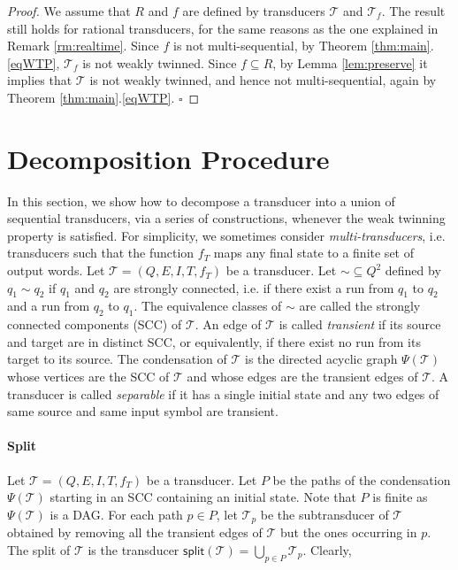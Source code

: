 \documentclass[envcountsame]{llncs}
\newcommand\tra{\mathcal{T}}
\newcommand\eof{\hfill$\square$}
\begin{document}
\begin{proof}
    We assume that $R$ and $f$ are defined by transducers
    $\tra$ and $\tra_f$. The result still holds for 
    rational transducers, for the same reasons as the one explained in
    Remark \ref{rm:realtime}. Since $f$ is
    not multi-sequential, by Theorem \ref{thm:main}.\ref{eqWTP},
    $\tra_f$ is not weakly twinned. Since $f\subseteq R$, by Lemma
    \ref{lem:preserve} it implies that $\tra$ is not weakly twinned, and hence not
    multi-sequential, again by Theorem
    \ref{thm:main}.\ref{eqWTP}. \eof
\end{proof}







\section{Decomposition Procedure}\label{sec:decomposition}

In this section, we show how to decompose a transducer into a union of
sequential transducers, via a series of constructions, whenever the weak twinning property is
satisfied. For simplicity, we sometimes consider \emph{multi-transducers},
i.e. transducers such that the function $f_T$ maps any final state to
a finite set of output words. Let $\tra = (Q,E,I,T,f_T)$ be a transducer.
Let $\sim\subseteq Q^2$ defined by $q_1 \sim q_2$ if $q_1$ and $q_2$
are strongly connected, i.e. if there exist a run from $q_1$ to $q_2$ and a run from $q_2$ to $q_1$.
The equivalence classes of $\sim$ are called the strongly connected
components (SCC) of $\tra$. An edge of $\tra$ is called \emph{transient} if its source and 
target are in distinct SCC, or equivalently, if there exist no run from its target to its source.
The condensation of $\tra$ is the directed acyclic graph $\Psi (\tra)$ whose vertices are the SCC of $\tra$ and whose edges are the transient edges of $\tra$.
A transducer is called \emph{separable} if it has a single initial
state and any two edges of same source and same input symbol are
transient.


\paragraph{\textbf{Split}} Let $\tra = (Q,E,I,T,f_T)$ be a transducer. Let $P$ be the paths of the condensation $\Psi(\tra)$ starting in an SCC containing an initial state. Note that $P$ is finite as $\Psi (\tra)$ is a DAG.
For each path $p \in P$, let $\tra_p$ be the subtransducer of $\tra$
obtained by removing all the transient edges of $\tra$ but the ones
occurring in $p$. The split of $\tra$ is the transducer
$\textsf{split}(\tra) =\bigcup_{p \in P}\tra_p$. Clearly,
\end{document}
